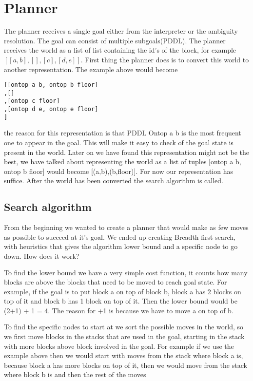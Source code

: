 \documentclass[11pt]{article}
\begin{document}
\section{Planner}
The planner receives a single goal either from the interpreter or the ambiguity resolution. The goal can consist of multiple subgoals(PDDL). The planner receives the world as a list of list containing the id's of the block, for example $[[a,b],[],[c],[d,e]]$. First thing the planner does is to convert this world to another representation. The example above would become 
\begin{verbatim}
[[ontop a b, ontop b floor]
,[]
,[ontop c floor]
,[ontop d e, ontop e floor]
]
\end{verbatim}
the reason for this representation is that PDDL Ontop a b is the most frequent one to appear in the goal. This will make it easy to check of the goal state is present in the world. Later on we have found this representation might not be the best, we have talked about representing the world as a list of tuples [ontop a b, ontop b floor]  would become [(a,b),(b,floor)]. For now our representation has suffice. After the world has been converted the search algorithm is called.


\subsection{Search algorithm}  
From the beginning we wanted to create a planner that would make as few moves as possible to succeed at it's goal. We ended up creating Breadth first search, with heuristics that gives the algorithm lower bound and a specific node to go down. How does it work?

To find the lower bound we have a very simple cost function, it counts how many blocks are above the blocks that need to be moved to reach goal state. For example, if the goal is to put block a on top of block b, block a has 2 blocks on top of it and block b has 1 block on top of it. Then the lower bound would be (2+1) + 1 = 4. The reason for +1 is because we have to move a on top of b. 

To find the specific nodes to start at we sort the possible moves in the world, so we first move blocks in the stacks that are used in the goal, starting in the stack with more blocks above block involved in the goal. For example if we use the example above then we would  start with moves from the stack where block a is, because block a has more blocks on top of it, then we would move from the stack where block b is and then the rest of the moves
\end{document}
